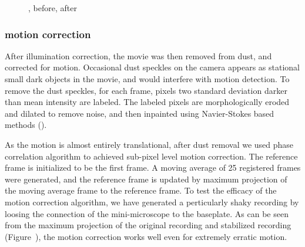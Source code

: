 \begin{figure}[h]
    \begin{subfigure}[t]{.5\textwidth}
        \centering
    \end{subfigure}
    \begin{subfigure}[t]{.5\textwidth}
        \centering
    \end{subfigure}
    \caption{\label{f.illumination}, before, after}
\end{figure}

\subsubsection{motion correction}
After illumination correction, the movie was then removed from dust, and corrected for motion. Occasional dust speckles on the camera appears as stational small dark objects in the movie, and would interfere with motion detection. To remove the dust speckles, for each frame, pixels two standard deviation darker than mean intensity are labeled. The labeled pixels are morphologically eroded and dilated to remove noise, and then inpainted using Navier-Stokes based methods ().

As the motion is almost entirely translational, after dust removal we used phase correlation algorithm to achieved sub-pixel level motion correction. The reference frame is initialized to be the first frame. A moving average of 25 registered frames were generated, and the reference frame is updated by maximum projection of the moving average frame to the reference frame. To test the efficacy of the motion correction algorithm, we have generated a perticularly shaky recording by loosing the connection of the mini-microscope to the baseplate. As can be seen from the maximum projection of the original recording and stabilized recording (Figure~), the motion correction works well even for extremely erratic motion. 


